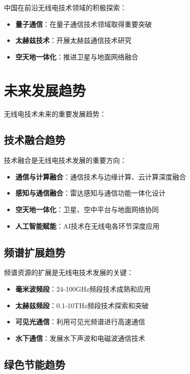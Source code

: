 \documentclass[12pt,UTF8]{ctexbook}
\begin{document}
中国在前沿无线电技术领域的积极探索：

\begin{itemize}[leftmargin=3.5em]
    \item \textbf{量子通信}：在量子通信技术领域取得重要突破
    \item \textbf{太赫兹技术}：开展太赫兹通信技术研究
    \item \textbf{空天地一体化}：推进卫星与地面网络融合
\end{itemize}

\chapter{未来发展趋势}

无线电技术未来的重要发展趋势：

\section{技术融合趋势}

技术融合是无线电技术发展的重要方向：

\begin{itemize}[leftmargin=3.5em]
    \item \textbf{通信与计算融合}：通信技术与边缘计算、云计算深度融合
    \item \textbf{感知与通信融合}：雷达感知与通信功能一体化设计
    \item \textbf{空天地一体化}：卫星、空中平台与地面网络协同
    \item \textbf{人工智能赋能}：AI技术在无线电各环节深度应用
\end{itemize}

\section{频谱扩展趋势}

频谱资源的扩展是无线电技术发展的关键：

\begin{itemize}[leftmargin=3.5em]
    \item \textbf{毫米波频段}：24-100GHz频段技术成熟和应用
    \item \textbf{太赫兹频段}：0.1-10THz频段技术探索和突破
    \item \textbf{可见光通信}：利用可见光频谱进行高速通信
    \item \textbf{水下通信}：发展水下声波和电磁波通信技术
\end{itemize}

\section{绿色节能趋势}
\end{document}
